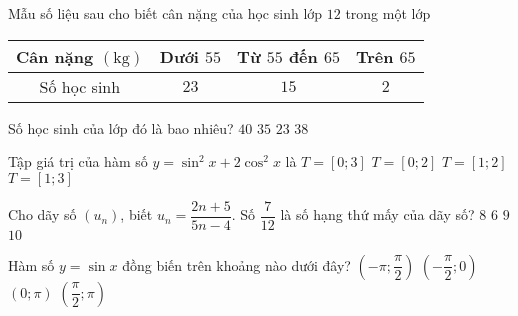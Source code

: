 \begin{ex}%
Mẫu số liệu sau cho biết cân nặng của học sinh lớp $12$ trong một lớp
\begin{center}
\begin{tabular}{|c|c|c|c|}
\hline Cân nặng $(\mathrm{kg})$ & Dưới $55$ & Từ $55$ đến $65$ & Trên $65$ \\
\hline Số học sinh & $23$ & $15$ & $2$ \\
\hline
\end{tabular}
\end{center}
Số học sinh của lớp đó là bao nhiêu?
\choice
{\True $40$}
{$35$}
{$23$}
{$38$}
\end{ex}

\begin{ex}%
Tập giá trị của hàm số $y=\sin^2x+2\cos^2x$ là
\choice
{$T=\left[0;3\right]$}
{$T=\left[0;2\right]$}
{\True $T=\left[1;2\right]$}
{$T=\left[1;3\right]$}
\end{ex}

\begin{ex}%
Cho dãy số $\left(u_n\right)$, biết $u_n=\dfrac{2 n+5}{5 n-4}$. Số $\dfrac{7}{12}$ là số hạng thứ mấy của dãy số?
\choice
{\True $8$}
{$6$}
{$9$}
{$10$}
\end{ex}

\begin{ex}%
Hàm số $y=\sin x$ đồng biến trên khoảng nào dưới đây?
\choice
{$\left(-\pi;\dfrac{\pi}{2}\right)$}
{\True $\left(-\dfrac{\pi}{2};0\right)$}
{$\left(0;\pi \right)$}
{$\left(\dfrac{\pi}{2};\pi \right)$}
\end{ex}

